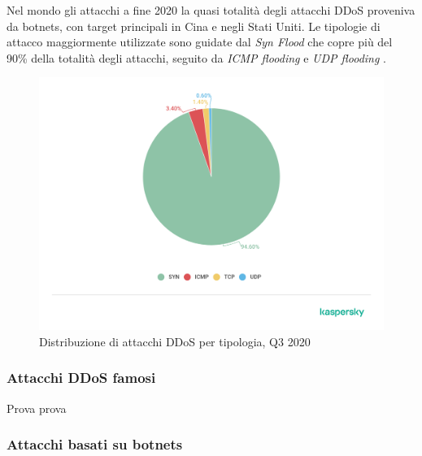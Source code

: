 Nel mondo gli attacchi a fine 2020 la quasi totalità degli attacchi DDoS proveniva da botnets, con target principali in Cina e negli Stati Uniti. Le tipologie di attacco maggiormente utilizzate sono guidate dal \emph{Syn Flood} che copre più del 90\% della totalità degli attacchi, seguito da \emph{ICMP flooding} e \emph{UDP flooding} \cite{ddos_kaspersky} \cite{ddos_kaspersky_q3_2020}.

\begin{figure}[h]
    \includegraphics[width=\hsize]{images/introduzione/07-en-ddos-report-q3-2020-chrarts.png}
    \caption{Distribuzione di attacchi DDoS per tipologia, Q3 2020 \cite{ddos_kaspersky_q3_2020}}
    \centering
\end{figure}

\subsubsection{Attacchi DDoS famosi}

Prova prova

\subsubsection{Attacchi basati su botnets}

